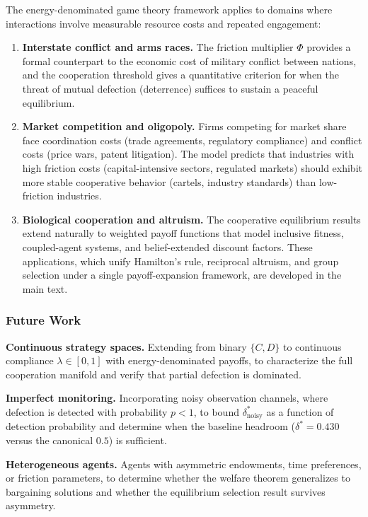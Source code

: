 \documentclass[11pt]{article}
\theoremstyle{plain}
\theoremstyle{definition}
\theoremstyle{remark}
\let\origsubsubsection\subsubsection
\renewcommand{\subsubsection}{\needspace{4\baselineskip}\origsubsubsection}
\begin{document}
The energy-denominated game theory framework applies to domains where
interactions involve measurable resource costs and repeated engagement:

\begin{enumerate}
\def\labelenumi{\arabic{enumi}.}
\item
  \textbf{Interstate conflict and arms races.} The friction multiplier
  \(\Phi\) provides a formal counterpart to the economic cost of
  military conflict between nations, and the cooperation threshold gives
  a quantitative criterion for when the threat of mutual defection
  (deterrence) suffices to sustain a peaceful equilibrium.
\item
  \textbf{Market competition and oligopoly.} Firms competing for market
  share face coordination costs (trade agreements, regulatory
  compliance) and conflict costs (price wars, patent litigation). The
  model predicts that industries with high friction costs
  (capital-intensive sectors, regulated markets) should exhibit more
  stable cooperative behavior (cartels, industry standards) than
  low-friction industries.
\item
  \textbf{Biological cooperation and altruism.} The cooperative
  equilibrium results extend naturally to weighted payoff functions that
  model inclusive fitness, coupled-agent systems, and belief-extended
  discount factors. These applications, which unify Hamilton's rule,
  reciprocal altruism, and group selection under a single
  payoff-expansion framework, are developed in the main text.
\end{enumerate}

\subsubsection{Future Work}\label{future-work-4}

\textbf{Continuous strategy spaces.} Extending from binary \(\{C, D\}\)
to continuous compliance \(\lambda \in [0,1]\) with energy-denominated
payoffs, to characterize the full cooperation manifold and verify that
partial defection is dominated.

\textbf{Imperfect monitoring.} Incorporating noisy observation channels,
where defection is detected with probability \(p < 1\), to bound
\(\delta^*_{\text{noisy}}\) as a function of detection probability and
determine when the baseline headroom (\(\delta^* = 0.430\) versus the
canonical \(0.5\)) is sufficient.

\textbf{Heterogeneous agents.} Agents with asymmetric endowments, time
preferences, or friction parameters, to determine whether the welfare
theorem generalizes to bargaining solutions and whether the equilibrium
selection result survives asymmetry.
\end{document}
